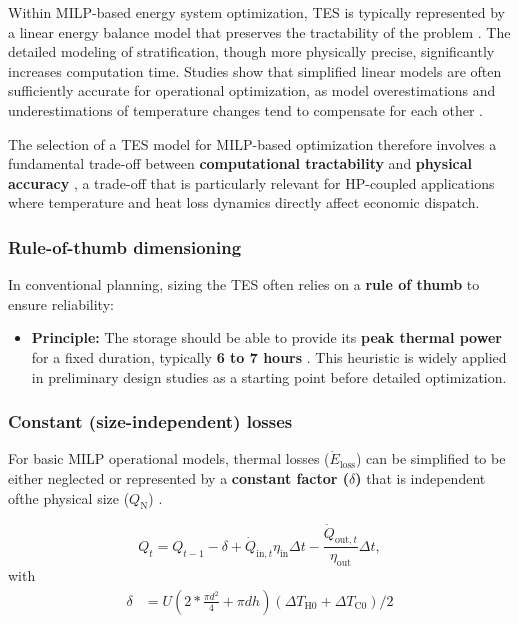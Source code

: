 \documentclass[11pt,a4paper]{report}
\begin{document}
Within MILP-based energy system optimization, TES is typically represented by a linear energy balance model that preserves the tractability of the problem \cite{Krien2020oemofsolph}. The detailed modeling of stratification, though more physically precise, significantly increases computation time. Studies show that simplified linear models are often sufficiently accurate for operational optimization, as model overestimations and underestimations of temperature changes tend to compensate for each other \cite{Germanbuiling}.

The selection of a TES model for MILP-based optimization therefore involves a fundamental trade-off between \textbf{computational tractability} and \textbf{physical accuracy} \cite{Krien2020oemofsolph}, a trade-off that is particularly relevant for HP-coupled applications where temperature and heat loss dynamics directly affect economic dispatch.



\subsubsection{Rule-of-thumb dimensioning}
In conventional planning, sizing the TES often relies on a \textbf{rule of thumb} to ensure reliability:
\begin{itemize}
    \item \textbf{Principle:} The storage should be able to provide its \textbf{peak thermal power} for a fixed duration, typically \textbf{6 to 7 hours} \cite{Krien2020oemofsolph}. This heuristic is widely applied in preliminary design studies as a starting point before detailed optimization.
\end{itemize}

\subsubsection{Constant (size-independent) losses}
For basic MILP operational models, thermal losses ($\dot{E}_{\text{loss}}$) can be simplified to be either neglected or represented by a \textbf{constant factor ($\delta$)} that is independent ofthe physical size ($Q_{\text{N}}$) \cite{Krien2020oemofsolph}.

\begin{equation}
Q_{t} = Q_{t-1}  - \delta + \dot{Q}_{\text{in},t} \eta_{\text{in}} \Delta t - \frac{\dot{Q}_{\text{out},t}}{\eta_{\text{out}}} \Delta t,
\label{eq:storage-simplified}
\end{equation}
with
\begin{align*}
\delta &= U (2 *\frac{\pi d^{2}}{4}+ \pi d h) \left(\Delta T_{\text{H0}} + \Delta T_{\text{C0}}\right)/2
\end{align*}
\end{document}
